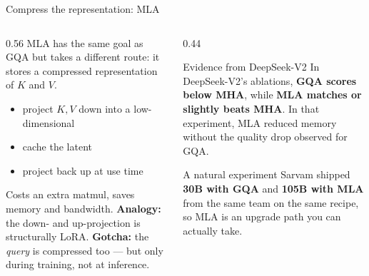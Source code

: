 \documentclass[aspectratio=169,10pt]{beamer}
\begin{document}
\begin{frame}{Compress the representation: MLA}
  \begin{columns}[T]
    \begin{column}{0.56\textwidth}
      MLA has the same goal as GQA but takes a different route: it stores a
      compressed representation of $K$ and $V$.
      \begin{itemize}
        \item project $K,V$ down into a low-dimensional 
        \item cache the latent
        \item project back up at use time
      \end{itemize}
      \vspace{0.4em}
      Costs an extra matmul, saves memory and bandwidth.
      \vspace{0.6em}
      \textbf{Analogy:} the down- and up-projection is structurally LoRA.
      \vspace{0.5em}
      \textbf{Gotcha:} the \emph{query} is compressed too --- but only during
      training, not at inference.
    \end{column}
    \begin{column}{0.44\textwidth}
      \begin{block}{Evidence from DeepSeek-V2}
        \small
        In DeepSeek-V2's ablations, \textbf{GQA scores below MHA}, while
        \textbf{MLA matches or slightly beats MHA}.
        \vspace{0.4em}
        In that experiment, MLA reduced memory without the quality drop
        observed for GQA.
      \end{block}
      \begin{block}{A natural experiment}
        \small
        Sarvam shipped \textbf{30B with GQA} and \textbf{105B with MLA} from
        the same team on the same recipe, so MLA is an upgrade path you can
        actually take.
      \end{block}
    \end{column}
  \end{columns}
\end{frame}
\end{document}
